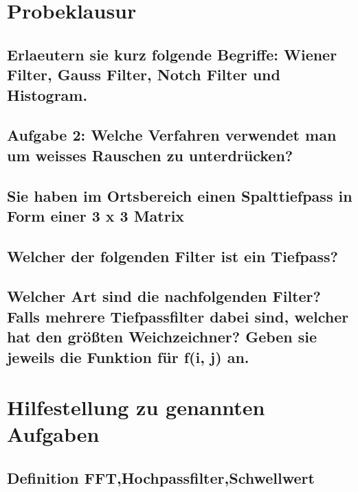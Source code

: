 \documentclass[pdftex,oneside,12pt,parskip=half,abstracton,ngerman]{scrartcl}
\begin{document}
         



\tableofcontents
\newpage
\section{Probeklausur}
\subsection{Erlaeutern sie kurz folgende Begriffe: Wiener Filter, Gauss Filter, Notch Filter und Histogram.}
\subsection{Aufgabe 2: Welche Verfahren verwendet man um weisses Rauschen zu unterdrücken?}
\subsection{Sie haben im Ortsbereich einen Spalttiefpass in Form einer 3 x 3 Matrix}
\subsection{Welcher der folgenden Filter ist ein Tiefpass?}
\subsection{Welcher Art sind die nachfolgenden Filter?
Falls mehrere Tiefpassfilter dabei sind, welcher hat den größten Weichzeichner?
Geben sie jeweils die Funktion für f(i, j) an.}


\section{Hilfestellung zu genannten Aufgaben}
\subsection{Definition FFT,Hochpassfilter,Schwellwert}
\end{document}
